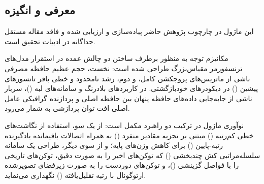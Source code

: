 \subsection{معرفی و انگیزه}
این ماژول در چارچوب پژوهش حاضر پیاده‌سازی و ارزیابی شده و فاقد مقاله مستقل جداگانه در ادبیات تحقیق است.

مکانیزم توجه  به منظور برطرف ساختن دو چالش عمده در استقرار مدل‌های ترنسفورمر مقیاس‌بزرگ طراحی شده است: نخست، حجم عظیم حافظه مصرفی ناشی از ماتریس‌های پروجکشن کامل، و دوم، رشد نامحدود و خطی بافر تانسورهای پیشین () در دیکودرهای خودبازگشتی. در کاربردهای بلادرنگ و سامانه‌های لبه ()، سربار ناشی از جابه‌جایی داده‌های حافظه پنهان بین حافظه اصلی و پردازنده گرافیکی عامل اصلی افت توان پردازشی به شمار می‌رود.

نوآوری ماژول  در ترکیب دو راهبرد مکمل است: از یک سو، استفاده از نگاشت‌های خطی کم‌رتبه () مبتنی بر تجزیه مقادیر منفرد () به همراه اتصالات باقیمانده یادگیرنده رتبه-پایین () برای کاهش وزن‌های پایه؛ و از سوی دیگر، طراحی یک سامانه سلسله‌مراتبی کش چندبخشی () که توکن‌های اخیر را به صورت دقیق، توکن‌های تاریخی را با فواصل گزینشی ()، و توکن‌های دوردست را به صورت زیرفضای تصویرشده ارتوگونال با رتبه تقلیل‌یافته () نگهداری می‌نماید.
